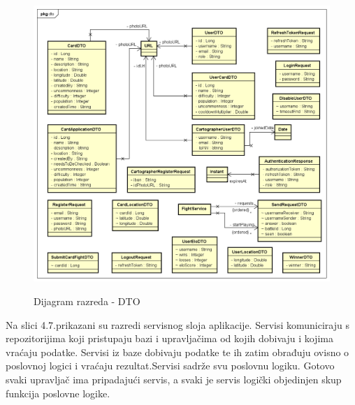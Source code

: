 			\begin{figure}[H]
				\centering
				\includegraphics[scale=0.72]{dijagrami/DTO_CD} \\
				\caption{Dijagram razreda - DTO}
				\label{fig:DTO_CD}
			\end{figure}
		
			\textnormal{
				Na slici 4.7.prikazani su razredi servisnog sloja aplikacije. Servisi komuniciraju s
				repozitorijima koji pristupaju bazi i upravljačima od kojih dobivaju i kojima
				vraćaju podatke. Servisi iz baze dobivaju podatke te ih zatim obrađuju ovisno o poslovnoj logici i vraćaju rezultat.Servisi sadrže svu poslovnu logiku. Gotovo svaki upravljač ima pripadajući servis, a svaki je servis logički objedinjen skup funkcija poslovne logike.
			}
		
